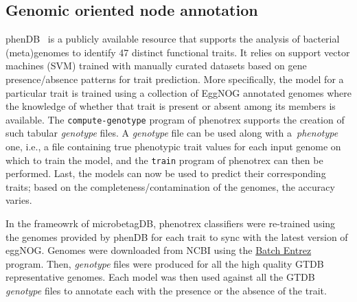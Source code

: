 \documentclass[sn-mathphys,Numbered]{sn-jnl}%
\theoremstyle{thmstyleone}%
\theoremstyle{thmstyletwo}%
\theoremstyle{thmstylethree}%
\begin{document}
    \subsection*{ Genomic oriented node annotation }
        \label{subsec:phen}

        phenDB~\cite{feldbauer2015prediction} is a publicly available resource that supports the analysis of bacterial (meta)genomes to identify 47 distinct functional traits. 
        It relies on support vector machines (SVM) trained with manually curated datasets based on gene presence/absence patterns for trait prediction.
        More specifically, the model for a particular trait is trained using a collection of EggNOG annotated genomes where the knowledge of whether that trait is present or absent among its members is available.
        The \texttt{compute-genotype} program of phenotrex supports the creation of such tabular \textit{genotype} files.
        A \textit{genotype} file can be used along with a~\textit{phenotype} one, i.e., a file containing true phenotypic trait values for each input genome on which to train the model, and the \texttt{train} program of phenotrex can then be performed. 
        Last, the models can now be used to predict their corresponding traits; based on the completeness/contamination of the genomes, the accuracy varies. 
        
        In the frameowrk of microbetagDB, phenotrex classifiers were re-trained using the genomes provided by phenDB for each trait to sync with the latest version of eggNOG. 
        Genomes were downloaded from NCBI using the \href{https://www.ncbi.nlm.nih.gov/sites/batchentrez}{Batch Entrez} program.
        Then, \textit{genotype} files were produced for all the high quality GTDB representative genomes.
        Each model was then used against all the GTDB \textit{genotype} files to annotate each with the presence or the absence of the trait. 
\end{document}
